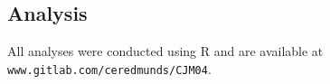 \documentclass[12pt]{article}
\begin{document}


\subsection{Analysis} 
All analyses were conducted using R \cite{Rcite} and are available at
\texttt{www.gitlab.com/ceredmunds/CJM04}.
\end{document}
